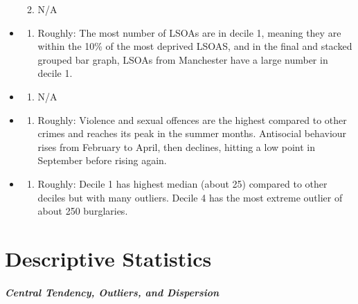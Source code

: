 \documentclass[
]{book}
\providecommand{\tightlist}{%
  \setlength{\itemsep}{0pt}\setlength{\parskip}{0pt}}
\begin{document}
\begin{itemize}
\begin{enumerate}
  \def\labelenumi{\arabic{enumi}.}
  \setcounter{enumi}{7}
  \tightlist
  \item
    N/A
  \end{enumerate}
\item
  \begin{enumerate}
  \def\labelenumi{\arabic{enumi}.}
  \setcounter{enumi}{8}
  \tightlist
  \item
    Roughly: The most number of LSOAs are in decile 1, meaning they are within the 10\% of the most deprived LSOAS, and in the final and stacked grouped bar graph, LSOAs from Manchester have a large number in decile 1.
  \end{enumerate}
\item
  \begin{enumerate}
  \def\labelenumi{\arabic{enumi}.}
  \setcounter{enumi}{9}
  \tightlist
  \item
    N/A
  \end{enumerate}
\item
  \begin{enumerate}
  \def\labelenumi{\arabic{enumi}.}
  \setcounter{enumi}{10}
  \tightlist
  \item
    Roughly: Violence and sexual offences are the highest compared to other crimes and reaches its peak in the summer months. Antisocial behaviour rises from February to April, then declines, hitting a low point in September before rising again.
  \end{enumerate}
\item
  \begin{enumerate}
  \def\labelenumi{\arabic{enumi}.}
  \setcounter{enumi}{11}
  \tightlist
  \item
    Roughly: Decile 1 has highest median (about 25) compared to other deciles but with many outliers. Decile 4 has the most extreme outlier of about 250 burglaries.
  \end{enumerate}
\end{itemize}

\hypertarget{descriptive-statistics}{%
\chapter{Descriptive Statistics}\label{descriptive-statistics}}

\hypertarget{central-tendency-outliers-and-dispersion}{%
\subsubsection*{\texorpdfstring{\emph{Central Tendency, Outliers, and Dispersion}}{Central Tendency, Outliers, and Dispersion}}\label{central-tendency-outliers-and-dispersion}}
\end{document}
